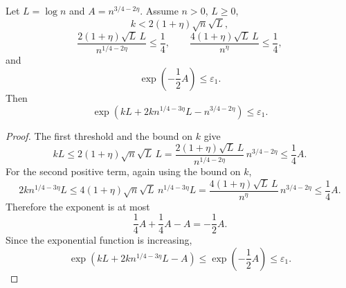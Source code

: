 \begin{helper}
Let \(L=\log n\) and \(A=n^{3/4-2\eta}\).  Assume \(n>0\), \(L\ge0\),
\[
k<2(1+\eta)\sqrt n\sqrt L,
\]
\[
\frac{2(1+\eta)\sqrt L\,L}{n^{1/4-2\eta}}\le\frac14,
\qquad
\frac{4(1+\eta)\sqrt L\,L}{n^\eta}\le\frac14,
\]
and
\[
\exp\!\left(-\frac12 A\right)\le\varepsilon_1.
\]
Then
\[
\exp\!\left(kL+2k n^{1/4-3\eta}L-n^{3/4-2\eta}\right)\le\varepsilon_1.
\]
\end{helper}
\begin{proof}
The first threshold and the bound on \(k\) give
\[
kL\le 2(1+\eta)\sqrt n\sqrt L\,L
 =\frac{2(1+\eta)\sqrt L\,L}{n^{1/4-2\eta}}\,n^{3/4-2\eta}
\le \frac14 A.
\]
For the second positive term, again using the bound on \(k\),
\[
2k n^{1/4-3\eta}L
\le 4(1+\eta)\sqrt n\sqrt L\,n^{1/4-3\eta}L
=\frac{4(1+\eta)\sqrt L\,L}{n^\eta}\,n^{3/4-2\eta}
\le \frac14 A.
\]
Therefore the exponent is at most
\[
\frac14A+\frac14A-A=-\frac12A.
\]
Since the exponential function is increasing,
\[
\exp\!\left(kL+2k n^{1/4-3\eta}L-A\right)
\le \exp\!\left(-\frac12 A\right)\le \varepsilon_1.
\]
\end{proof}
